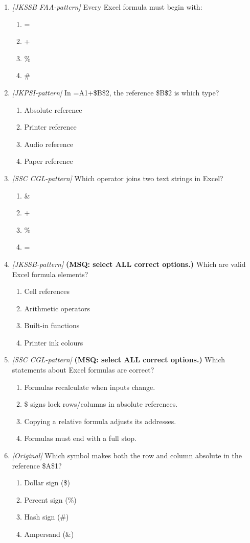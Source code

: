 \begin{enumerate}[label=\textbf{Q\arabic*.}, leftmargin=*]
\item \textit{[JKSSB FAA-pattern]} Every Excel formula must begin with:
  \begin{enumerate}[label=\Alph*.]
    \item =
    \item +
    \item \%
    \item \#
  \end{enumerate}
\item \textit{[JKPSI-pattern]} In =A1+\$B\$2, the reference \$B\$2 is which type?
  \begin{enumerate}[label=\Alph*.]
    \item Absolute reference
    \item Printer reference
    \item Audio reference
    \item Paper reference
  \end{enumerate}
\item \textit{[SSC CGL-pattern]} Which operator joins two text strings in Excel?
  \begin{enumerate}[label=\Alph*.]
    \item \&
    \item +
    \item \%
    \item =
  \end{enumerate}
\item \textit{[JKSSB-pattern]} \textbf{(MSQ: select ALL correct options.)} Which are valid Excel formula elements?
  \begin{enumerate}[label=\Alph*.]
    \item Cell references
    \item Arithmetic operators
    \item Built-in functions
    \item Printer ink colours
  \end{enumerate}
\item \textit{[SSC CGL-pattern]} \textbf{(MSQ: select ALL correct options.)} Which statements about Excel formulas are correct?
  \begin{enumerate}[label=\Alph*.]
    \item Formulas recalculate when inputs change.
    \item \$ signs lock rows/columns in absolute references.
    \item Copying a relative formula adjusts its addresses.
    \item Formulas must end with a full stop.
  \end{enumerate}
\item \textit{[Original]} Which symbol makes both the row and column absolute in the reference \$A\$1?
  \begin{enumerate}[label=\Alph*.]
\item Dollar sign (\$)
   \item Percent sign (\%)
   \item Hash sign (\#)
   \item Ampersand (\&)
  \end{enumerate}


\end{enumerate}
